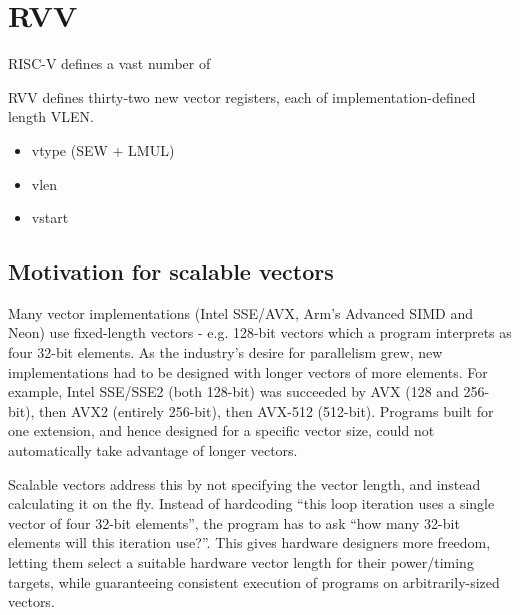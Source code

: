 \section{RVV}\label{chap:bg:sec:rvv}
RISC-V defines a vast number of 

RVV defines thirty-two new vector registers, each of implementation-defined length VLEN.
\begin{itemize}
    \item vtype (SEW + LMUL)
    \item vlen
    \item vstart
\end{itemize}



\subsection{Motivation for scalable vectors}
Many vector implementations (Intel SSE/AVX, Arm's Advanced SIMD and Neon) use fixed-length vectors - e.g. 128-bit vectors which a program interprets as four 32-bit elements.
As the industry's desire for parallelism grew, new implementations had to be designed with longer vectors of more elements.
For example, Intel SSE/SSE2 (both 128-bit) was succeeded by AVX (128 and 256-bit), then AVX2 (entirely 256-bit), then AVX-512 (512-bit).
Programs built for one extension, and hence designed for a specific vector size, could not automatically take advantage of longer vectors.

Scalable vectors address this by not specifying the vector length, and instead calculating it on the fly.
Instead of hardcoding \enquote{this loop iteration uses a single vector of four 32-bit elements}, the program has to ask \enquote{how many 32-bit elements will this iteration use?}.
This gives hardware designers more freedom, letting them select a suitable hardware vector length for their power/timing targets, while guaranteeing consistent execution of programs on arbitrarily-sized vectors.


